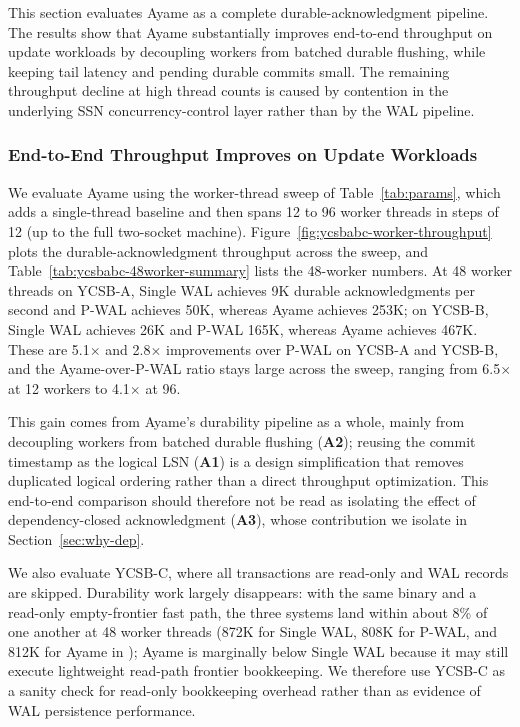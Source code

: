 This section evaluates Ayame as a complete durable-acknowledgment pipeline.
The results show that Ayame substantially improves end-to-end throughput on
update workloads by decoupling workers from batched durable flushing, while
keeping tail latency and pending durable commits small.  The remaining
throughput decline at high thread counts is caused by contention in the
underlying SSN concurrency-control layer rather than by the WAL pipeline.

\subsubsection{End-to-End Throughput Improves on Update Workloads}

We evaluate Ayame using the worker-thread sweep of Table~\ref{tab:params},
which adds a single-thread baseline and then spans 12 to 96 worker threads in
steps of 12 (up to the full two-socket machine).
Figure~\ref{fig:ycsbabc-worker-throughput} plots the durable-acknowledgment
throughput across the sweep, and Table~\ref{tab:ycsbabc-48worker-summary} lists
the 48-worker numbers.  At 48 worker threads on YCSB-A, Single WAL achieves 9K
durable acknowledgments per second and P-WAL achieves 50K, whereas Ayame
achieves 253K; on YCSB-B, Single WAL achieves 26K and P-WAL 165K, whereas Ayame
achieves 467K.  These are
5.1$\times$ and 2.8$\times$ improvements over P-WAL on YCSB-A and YCSB-B, and
the Ayame-over-P-WAL ratio stays large across the sweep, ranging from
6.5$\times$ at 12 workers to 4.1$\times$ at 96.

This gain comes from Ayame's durability pipeline as a whole, mainly from
decoupling workers from batched durable flushing (\textbf{A2}); reusing the
commit timestamp as the logical LSN (\textbf{A1}) is a design simplification
that removes duplicated logical ordering rather than a direct throughput
optimization.  This end-to-end comparison should therefore not be read as
isolating the effect of dependency-closed acknowledgment (\textbf{A3}), whose
contribution we isolate in Section~\ref{sec:why-dep}.

We also evaluate YCSB-C, where all transactions are read-only and WAL records
are skipped.  Durability work largely disappears: with the same binary and a
read-only empty-frontier fast path, the three systems land within about 8\% of
one another at 48 worker threads (872K for Single WAL, 808K for P-WAL, and 812K
for Ayame in ); Ayame is marginally
below Single WAL because it may still execute lightweight read-path frontier
bookkeeping.  We therefore use YCSB-C as a sanity check for read-only
bookkeeping overhead rather than as evidence of WAL persistence performance.

